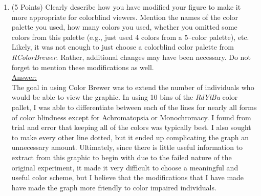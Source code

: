 \documentclass[12pt,letterpaper,final]{article}
\begin{document}
\begin{enumerate}
\begin{enumerate}
\item (5 Points) Clearly describe how you have modified your figure to make
it more appropriate for colorblind viewers. Mention the names of the color
palette you used, how many colors you used, whether you omitted some colors
from this palette (e.g., just used 4 colors from a 5--color palette), etc.
Likely, it was not enough
to just choose a colorblind color palette from {\it RColorBrewer}.
Rather, additional changes may have been necessary. Do not forget to mention
these modifications as well. \\

\underline{Answer:} \\
{\scriptsize
The goal in using Color Brewer was to extend the number of individuals who would be able to view the graphic.  In using 10 bins of the {\it RdYlBu} color pallet, I was able to differentiate between each of the lines for nearly all forms of color blindness except for Achromatopsia or Monochromacy.  I found from trial and error that keeping all of the colors was typically best.  I also sought to make every other line dotted, but it ended up complicating the graph an unnecessary amount.  Ultimately, since there is little useful information to extract from this graphic to begin with due to the failed nature of the original experiment, it made it very difficult to choose a meaningful and useful color scheme, but I believe that the modifications that I have made have made the graph more friendly to color impaired individuals.
}

\end{enumerate}

\end{enumerate}


\newpage


~\\
\end{document}
